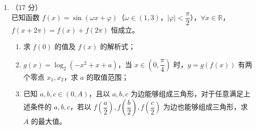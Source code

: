 \documentclass[10pt]{exam-zh}
\begin{document}
\begin{enumerate}[leftmargin=*, label=\arabic*.]
\begin{enumerate}[label=(\arabic*)]
		\end{enumerate}
		\vspace{8cm}
		\newpage
		\item[19.] （17 分）\\
		已知函数 \( f(x) = \sin(\omega x + \varphi) \)（\(\omega \in (1, 3)\)，\(|\varphi| < \dfrac{\pi}{2}\)），\(\forall x \in \mathbb{R}\)，\(f(x+2\pi) = f(x) + f(2\pi)\) 恒成立。
		\begin{enumerate}[label=(\arabic*)]
			\item 求 \( f(0) \) 的值及 \( f(x) \) 的解析式；
			\item \( g(x) = \log_2(-x^2 + x + a) \)，当 \( x \in (0, \dfrac{\pi}{4}) \) 时，\( y = g\left(f(x)\right) \) 有两个零点 \( x_1, x_2 \)，求 \( a \) 的取值范围；
			\item 已知 \( a, b, c \in (0, A) \)，且以 \( a, b, c \) 为边能够组成三角形，对于任意满足上述条件的 \( a, b, c \)，若以 \( f(\dfrac{a}{2}), f(\dfrac{b}{2}), f(\dfrac{c}{2}) \) 为边也能够组成三角形，求 \( A \) 的最大值。
		\end{enumerate}
	\end{enumerate}
\small
\end{document}
